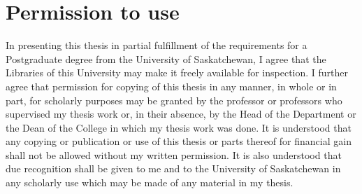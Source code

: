 \section*{Permission to use}
    In presenting this thesis in partial fulfillment of the requirements for a Postgraduate degree from the University of Saskatchewan, I agree that the Libraries of this University may make it freely available for inspection. I further agree that permission for copying of this thesis in any manner, in whole or in part, for scholarly purposes may be granted by the professor or professors who supervised my thesis work or, in their absence, by the Head of the Department or the Dean of the College in which my thesis work was done. It is understood that any copying or publication or use of this thesis or parts thereof for financial gain shall not be allowed without my written permission. It is also understood that due recognition shall be given to me and to the University of Saskatchewan in any scholarly use which may be made of any material in my thesis.